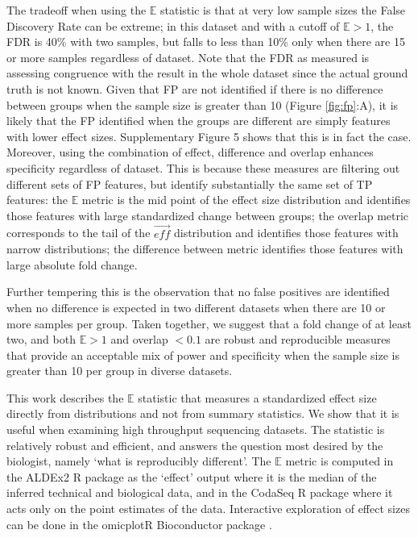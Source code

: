 \documentclass[fleqn,10pt,lineno]{wlpeerj}
\begin{document}
The tradeoff when using the $\mathbb{E}$ statistic is that at very low sample sizes the False Discovery Rate can be extreme; in this dataset and with a cutoff of $\mathbb{E} > 1$, the FDR is 40\% with two samples, but falls to less than 10\% only when there are 15 or more samples regardless of dataset. Note that the FDR as measured is assessing congruence with the result in the whole dataset since the actual ground truth is not known. Given that FP are not identified if there is no difference between groups when the sample size is greater than 10 (Figure \ref{fig:fp}:A), it is likely that the FP identified when the groups are different are simply features with lower effect sizes. Supplementary Figure 5 shows that this is in fact the case. Moreover, using the combination of effect, difference and overlap  enhances specificity regardless of dataset. This is because these measures are filtering out different sets of FP features, but identify substantially the same set of TP features: the $\mathbb{E}$ metric is the mid point of the effect size distribution and identifies those features with large standardized change between groups; the overlap metric corresponds to the tail of the $\vec{\mathit{eff}}$ distribution and identifies those features with narrow distributions; the difference between metric identifies those features with large absolute fold change.  

 Further tempering this is the observation that  no false positives are identified when no difference is expected in two different datasets when there are 10 or more samples per group.  Taken together, we suggest that a fold change of at least two, and both $\mathbb{E} > 1$ and overlap $< 0.1$ are robust and reproducible measures that provide an acceptable mix of power and specificity when the sample size is greater than 10 per group in diverse datasets. 

This work  describes the  $\mathbb{E}$ statistic that measures a standardized effect size directly from distributions and not from summary statistics. We show that it is useful when examining high throughput sequencing datasets. The statistic is relatively robust and efficient, and answers the question most desired by the biologist, namely `what is reproducibly different'.   The $\mathbb{E}$ metric is computed in the ALDEx2 R package as the `effect' output where it is the median of the inferred technical and biological data, and in the CodaSeq R package where it acts only on the point estimates of the data. Interactive exploration of effect sizes can be done in the omicplotR Bioconductor package \citep{omicplot}.
\end{document}
